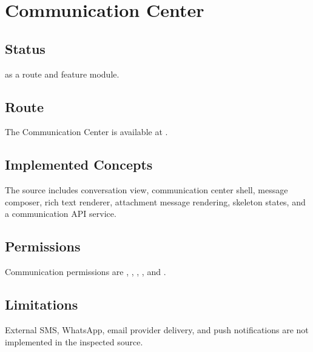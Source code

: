 \chapter{Communication Center}
\section{Status}
\implemented{} as a route and feature module.

\section{Route}
The Communication Center is available at .

\section{Implemented Concepts}
The source includes conversation view, communication center shell, message composer, rich text renderer, attachment message rendering, skeleton states, and a communication API service.

\section{Permissions}
Communication permissions are , , , , and .

\section{Limitations}
External SMS, WhatsApp, email provider delivery, and push notifications are not implemented in the inspected source.
